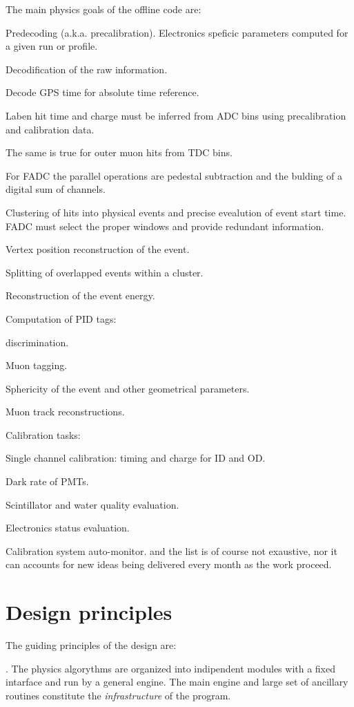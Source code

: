 The main physics goals of the offline code are:
\ben
\item Predecoding (a.k.a. precalibration). Electronics speficic parameters computed for a given run or profile.
\item Decodification of the raw information.
  \ben
  \item Decode GPS time for absolute time reference.
  \item Laben hit time and charge must be inferred from ADC bins using precalibration and calibration data.
  \item The same is true for outer muon hits from TDC bins.
  \item For FADC the parallel operations are pedestal subtraction and the bulding of a digital sum of channels.
    \een
\item Clustering of hits into physical events and precise evealution of event start time. FADC must select the proper windows and provide redundant information.
\item Vertex position reconstruction of the event.
\item Splitting of overlapped events within a cluster.
\item Reconstruction of the event energy.
\item Computation of PID tags:
  \ben
  \item \albe discrimination.
  \item Muon tagging.
  \item Sphericity of the event and other geometrical parameters.
  \een
\item Muon track reconstructions.
\item Calibration tasks:
  \ben 
  \item Single channel calibration: timing and charge for ID and OD.
  \item Dark rate of PMTs.
  \item Scintillator and water quality evaluation.
  \item Electronics status evaluation.
  \item Calibration system auto-monitor.
    \een
\een
and the list is of course not exaustive, nor it can accounts for new ideas being delivered every month as the work proceed.


\section{Design principles}
\label{sec:intro_design}

The guiding principles of the design are:
\bde
\item[Modulary]. 
  The physics algorythms are organized into indipendent modules with a fixed intarface and run by a general engine. 
  The main engine and large set of ancillary routines constitute the \emph{infrastructure} of the program.

